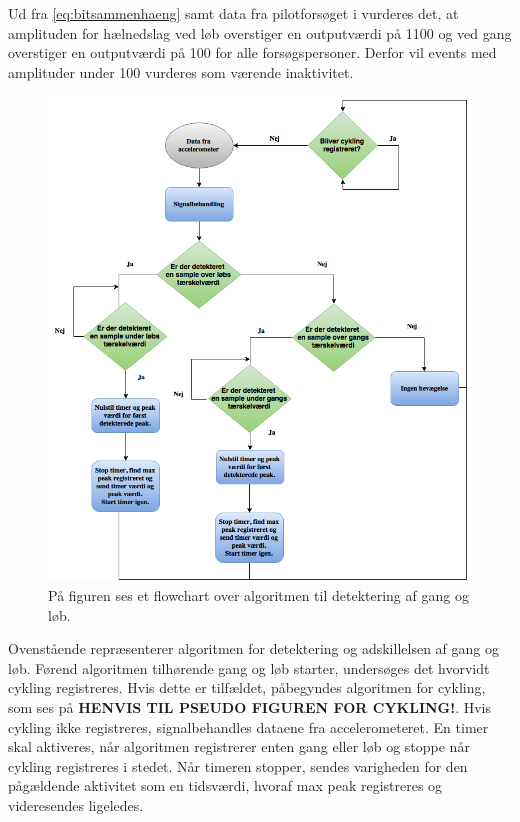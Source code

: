 Ud fra \eqref{eq:bitsammenhaeng} samt data fra pilotforsøget i  vurderes det, at amplituden for hælnedslag ved løb overstiger en outputværdi på 1100 og ved gang overstiger en outputværdi på 100 for alle forsøgspersoner. Derfor vil events med amplituder under 100 vurderes som værende inaktivitet.
\begin{figure}[H]
	\centering
	\includegraphics[scale=0.5]{figures/cDesign/algoritme_gl.png}
	\caption{På figuren ses et flowchart over algoritmen til detektering af gang og løb.}
	\label{fig:algoritme}
\end{figure}
Ovenstående  repræsenterer algoritmen for detektering og adskillelsen af gang og løb. Førend algoritmen tilhørende gang og løb starter, undersøges det hvorvidt cykling registreres. Hvis dette er tilfældet, påbegyndes algoritmen for cykling, som ses på \textbf{HENVIS TIL PSEUDO FIGUREN FOR CYKLING!}. Hvis cykling ikke registreres, signalbehandles dataene fra accelerometeret. En timer skal aktiveres, når algoritmen registrerer enten gang eller løb og stoppe når cykling registreres i stedet. Når timeren stopper, sendes varigheden for den pågældende aktivitet som en tidsværdi, hvoraf max peak registreres og videresendes ligeledes. %
